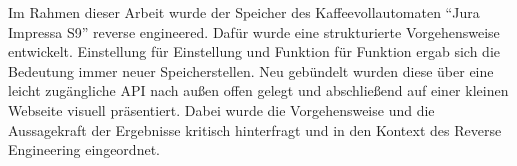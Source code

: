 Im Rahmen dieser Arbeit wurde der Speicher des Kaffeevollautomaten "`Jura Impressa S9"' reverse engineered.
Dafür wurde eine strukturierte Vorgehensweise entwickelt.
Einstellung für Einstellung und Funktion für Funktion ergab sich die Bedeutung immer neuer Speicherstellen.
Neu gebündelt wurden diese über eine leicht zugängliche \acs{API} nach außen offen gelegt und abschließend auf einer kleinen Webseite visuell präsentiert.
Dabei wurde die Vorgehensweise und die Aussagekraft der Ergebnisse kritisch hinterfragt und in den Kontext des Reverse Engineering eingeordnet.

